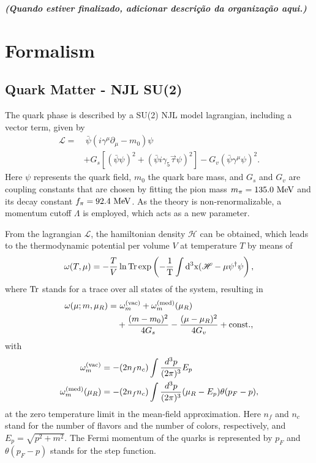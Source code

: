 \documentclass[prc, reprint, amsmath, floatfix,10pt]{revtex4-1}
\newcommand{\tr}{\rm{Tr}}
\newcommand{\comment}[1]{{\bf\textit{#1}}}
\begin{document}
\comment{(Quando estiver finalizado, adicionar descrição da organização aqui.)}

\section{Formalism}

\subsection{Quark Matter - NJL SU(2)}\label{NJLSU2}


The quark phase is described by a SU(2) NJL model lagrangian, including a vector term, given by \cite{Buballa2005}
\begin{equation}\label{Eq:LagNJL-SU2-Bub}
\begin{split}
	\mathscr{L} =&~ \bar{\psi}(i\gamma^\mu\partial_\mu - m_0)\psi \\
	&+ G_s[(\bar{\psi}\psi)^2 + (\bar{\psi}i\gamma_5\vec{\tau}\psi)^2] - G_v(\bar{\psi}\gamma^\mu \psi)^2.
\end{split}
\end{equation}
%
Here $\psi$ represents the quark field, $m_0$ the quark bare mass, and $G_s$ and $G_v$ are coupling constants that are chosen by fitting the pion mass $m_\pi = 135.0~\rm{MeV}$ and its decay constant $f_\pi = 92.4~\rm{MeV}$. As the theory is non-renormalizable, a momentum cutoff $\Lambda$ is employed, which acts as a new parameter.

From the lagrangian $\mathscr{L}$, the hamiltonian density $\mathscr{H}$ can be obtained, which leads to the thermodynamic potential per volume $V$ at temperature $T$ by means of
\begin{equation}
	\omega(T, \mu) = -\frac{T}{V} \ln \tr \exp\left(-\frac{1}{T}\int d^3x(\mathscr{H} - \mu\psi^\dagger\psi\right),
\end{equation}
%
where $\tr$ stands for a trace over all states of the system, resulting in \cite{Buballa1996}
\begin{equation}\label{Eq:Pot_Termo_Temp_zero}
\begin{split}
	\omega(\mu; m, \mu_R) =&~ \omega_m^{(\rm{vac})} + \omega_m^{(\rm{med})}(\mu_R) \\
	&+ \frac{(m - m_0)^2}{4G_s} - \frac{(\mu - \mu_R)^2}{4G_v} +  \textrm{const.},
\end{split}
\end{equation}
%
with
\begin{align}
	\omega_m^{(\rm{vac})} &= -(2 n_f n_c) \int \frac{d^3p}{(2\pi)^3} E_p\\
	\omega_m^{(\rm{med})}(\mu_R) &= - (2n_f n_c) \int\frac{d^3p}{(2 \pi)^3} (\mu_R - E_p) \theta(p_F -p),
\end{align}
%
at the zero temperature limit in the mean-field approximation. Here $n_f$ and $n_c$ stand for the number of flavors and the number of colors, respectively, and $E_p = \sqrt{p^2 + m^2}$. The Fermi momentum of the quarks is represented by $p_F$ and $\theta(p_F - p)$ stands for the step function.
\end{document}
